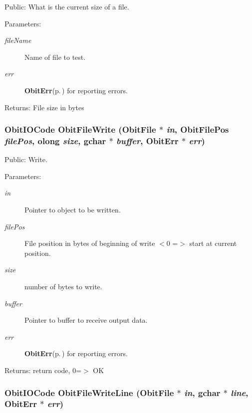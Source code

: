 Public: What is the current size of a file. 

\begin{Desc}
\item[Parameters:]
\begin{description}
\item[{\em file\-Name}]Name of file to test. \item[{\em err}]{\bf Obit\-Err}{\rm (p.\,\pageref{structObitErr})} for reporting errors. \end{description}
\end{Desc}
\begin{Desc}
\item[Returns:]File size in bytes \end{Desc}
\subsubsection{\setlength{\rightskip}{0pt plus 5cm}Obit\-IOCode Obit\-File\-Write ({\bf Obit\-File} $\ast$ {\em in}, {\bf Obit\-File\-Pos} {\em file\-Pos}, {\bf olong} {\em size}, gchar $\ast$ {\em buffer}, {\bf Obit\-Err} $\ast$ {\em err})}\label{ObitFile_8c_a21}


Public: Write. 

\begin{Desc}
\item[Parameters:]
\begin{description}
\item[{\em in}]Pointer to object to be written. \item[{\em file\-Pos}]File position in bytes of beginning of write $<$0 =$>$ start at current position. \item[{\em size}]number of bytes to write. \item[{\em buffer}]Pointer to buffer to receive output data. \item[{\em err}]{\bf Obit\-Err}{\rm (p.\,\pageref{structObitErr})} for reporting errors. \end{description}
\end{Desc}
\begin{Desc}
\item[Returns:]return code, 0=$>$ OK \end{Desc}
\subsubsection{\setlength{\rightskip}{0pt plus 5cm}Obit\-IOCode Obit\-File\-Write\-Line ({\bf Obit\-File} $\ast$ {\em in}, gchar $\ast$ {\em line}, {\bf Obit\-Err} $\ast$ {\em err})}\label{ObitFile_8c_a22}


